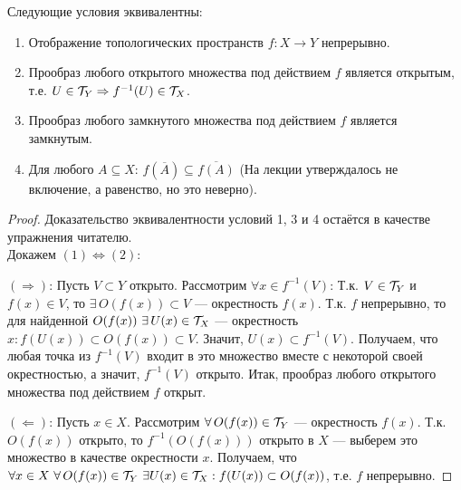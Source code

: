 \begin{statement} %
    Следующие условия эквивалентны:
    \begin{enumerate} %
        \item Отображение топологических пространств $f: X \rightarrow Y$ непрерывно.
        \item Прообраз любого открытого множества под действием $f$ является открытым, т.е. $U \in \mathcal{T}_{Y} \Rightarrow f^{-1}(U) \in \mathcal{T}_{X}$.
        \item Прообраз любого замкнутого множества под действием $f$ является замкнутым.
        \item Для любого $A \subseteq X$: $f(\overline{A}) \subseteq \overline{f(A)}$ (На лекции утверждалось не включение, а равенство, но это неверно).
    \end{enumerate}
\end{statement}
\begin{proof}
    Доказательство эквивалентности условий 1, 3 и 4 остаётся в качестве упражнения читателю. \\
    Докажем $(1) \Leftrightarrow (2)$:

    $(\Rightarrow)$: Пусть $V \subset Y$ открыто. Рассмотрим $\forall x \in f^{-1}(V)$: Т.к. $V \in \mathcal{T}_{Y}$ и $f(x) \in V$, то $\exists \, O(f(x)) \subset V$ --- окрестность $f(x)$. Т.к. $f$ непрерывно, то для найденной $O(f(x)) \ \exists \, U(x) \in \mcT_{X}$ --- окрестность $x: f(U(x)) \subset O(f(x)) \subset V$.
    Значит, $U(x) \subset f^{-1}(V)$. Получаем, что любая точка из $f^{-1}(V)$ входит в это множество вместе с некоторой своей окрестностью, а значит, $f^{-1}(V)$ открыто. Итак, прообраз любого открытого множества под действием $f$ открыт.

    $(\Leftarrow)$: Пусть $x \in X$. Рассмотрим $\forall \, O(f(x)) \in \mathcal{T}_{Y}$ --- окрестность $f(x)$. Т.к. $O(f(x))$ открыто, то $f^{-1}(O(f(x)))$ открыто в $X$ --- выберем это множество в качестве окрестности $x$. Получаем, что $\forall x \in X \ \forall \, O(f(x)) \in \mathcal{T}_{Y} \ \exists U(x) \in \mathcal{T}_{X}: f(U(x)) \subset O(f(x))$, т.е. $f$ непрерывно.
\end{proof}